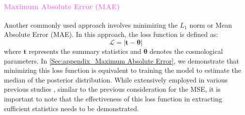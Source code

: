 \documentclass{aa}
\begin{document}
\paragraph{\textcolor{violet}{Maximum Absolute Error (MAE)}}
Another commonly used approach involves minimizing the $L_1$ norm or Mean Absolute Error (MAE). In this approach, the loss function is defined as:
\begin{equation}
    \mathcal{L}=|\bm{t}-\bm{\theta}|
\end{equation}
where $\bm{t}$ represents the summary statistics and $\bm{\theta}$ denotes the cosmological parameters.
In \autoref{Sec:appendix_Maximum Absolute Error}, we demonstrate that minimizing this loss function is equivalent to training the model to estimate the median of the posterior distribution. While extensively employed in various previous studies \citep{2018PhRvD..97j3515G, fluri2018cosmological, ribli2019weak}, similar to the previous consideration for the MSE, it is important to note that the effectiveness of this loss function in extracting sufficient statistics needs to be demonstrated.
\end{document}
